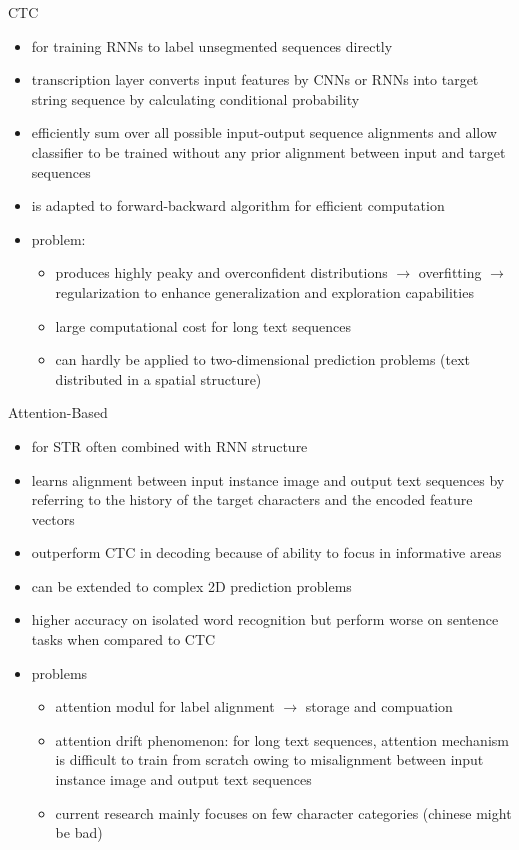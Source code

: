 CTC
\begin{itemize}
    \item for training RNNs to label unsegmented sequences directly
    \item transcription layer converts input features by CNNs or RNNs into target string sequence
        by calculating conditional probability
    \item efficiently sum over all possible input-output sequence alignments and allow classifier
        to be trained without any prior alignment between input and target sequences
    \item is adapted to forward-backward algorithm for efficient computation
    \item problem:
        \begin{itemize}
            \item produces highly peaky and overconfident distributions $\rightarrow$ overfitting
                $\rightarrow$ regularization to enhance generalization and exploration capabilities
            \item large computational cost for long text sequences
            \item can hardly be applied to two-dimensional prediction problems (text distributed
                in a spatial structure)
        \end{itemize}
\end{itemize}
Attention-Based
\begin{itemize}
    \item for STR often combined with RNN structure
    \item learns alignment between input instance image and output text sequences by referring
        to the history of the target characters and the encoded feature vectors
    \item outperform CTC in decoding because of ability to focus in informative areas
    \item can be extended to complex 2D prediction problems
    \item higher accuracy on isolated word recognition but perform worse on sentence tasks
        when compared to CTC
    \item problems
        \begin{itemize}
            \item attention modul for label alignment $\rightarrow$ storage and compuation
            \item attention drift phenomenon: for long text sequences, attention mechanism is difficult
                to train from scratch owing to misalignment between input instance image and output
                text sequences
            \item current research mainly focuses on few character categories (chinese might be bad)
        \end{itemize}
\end{itemize}

